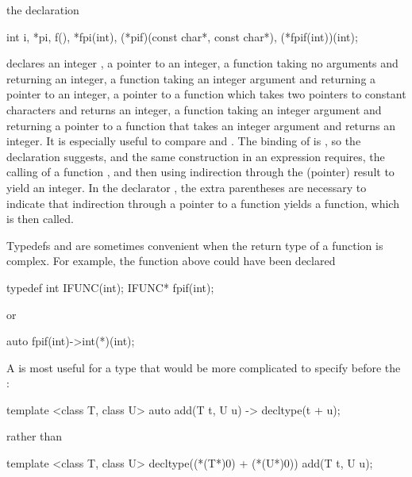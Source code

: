 \pnum
\begin{example}
the declaration

%
\begin{codeblock}
int i,
    *pi,
    f(),
    *fpi(int),
    (*pif)(const char*, const char*),
    (*fpif(int))(int);
\end{codeblock}

declares an integer
,
a pointer
to an integer,
a function
taking no arguments and returning an integer,
a function
taking an integer argument and returning a pointer to an integer,
a pointer
to a function which
takes two pointers to constant characters and returns an integer,
a function
taking an integer argument and returning a pointer to a function that takes an integer argument and returns an integer.
It is especially useful to compare
and
.
The binding of
is
,
so the declaration suggests,
and the same construction in an expression
requires, the calling of a function
,
and then using indirection through the (pointer) result
to yield an integer.
In the declarator
,
the extra parentheses are necessary to indicate that indirection through
a pointer to a function yields a function, which is then called.
\end{example}
\begin{note}
Typedefs and  are sometimes convenient when the return type of a function is complex.
For example,
the function
above could have been declared

\begin{codeblock}
typedef int  IFUNC(int);
IFUNC*  fpif(int);
\end{codeblock}

or

\begin{codeblock}
auto fpif(int)->int(*)(int);
\end{codeblock}

A  is most useful for a type that would be more complicated to specify before the :

\begin{codeblock}
template <class T, class U> auto add(T t, U u) -> decltype(t + u);
\end{codeblock}

rather than

\begin{codeblock}
template <class T, class U> decltype((*(T*)0) + (*(U*)0)) add(T t, U u);
\end{codeblock}
\end{note}

